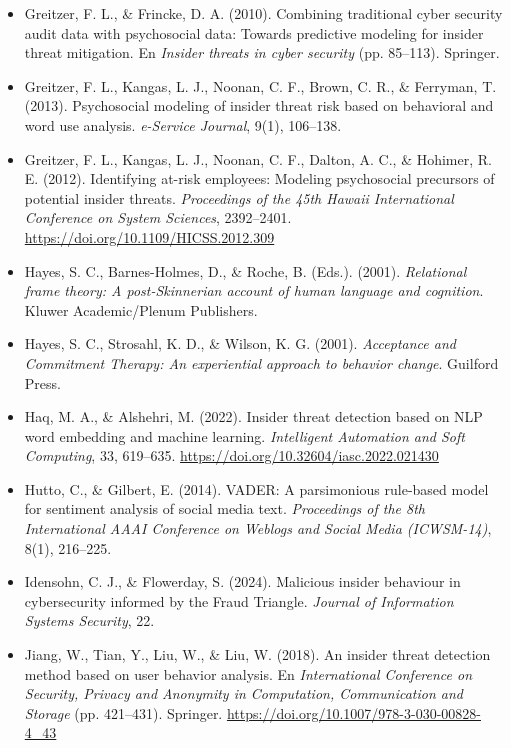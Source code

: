 \documentclass[IB]{TFUOC}%
\begin{document}
\begin{itemize}
    \item Greitzer, F. L., \& Frincke, D. A. (2010). Combining traditional 
    cyber security audit data with psychosocial data: Towards predictive 
    modeling for insider threat mitigation. En \textit{Insider threats in 
    cyber security} (pp. 85--113). Springer.

    \item Greitzer, F. L., Kangas, L. J., Noonan, C. F., Brown, C. R., \& 
    Ferryman, T. (2013). Psychosocial modeling of insider threat risk based 
    on behavioral and word use analysis. \textit{e-Service Journal}, 9(1), 
    106--138.

    \item Greitzer, F. L., Kangas, L. J., Noonan, C. F., Dalton, A. C., \& 
    Hohimer, R. E. (2012). Identifying at-risk employees: Modeling 
    psychosocial precursors of potential insider threats. 
    \textit{Proceedings of the 45th Hawaii International Conference on 
    System Sciences}, 2392--2401. 
    \url{https://doi.org/10.1109/HICSS.2012.309}

    \item Hayes, S. C., Barnes-Holmes, D., \& Roche, B. (Eds.). (2001). \textit{Relational frame theory: A post-Skinnerian account of human language and cognition}. Kluwer Academic/Plenum Publishers.

    \item Hayes, S. C., Strosahl, K. D., \& Wilson, K. G. (2001). \textit{Acceptance and Commitment Therapy: An experiential approach to behavior change}. Guilford Press.

    \item Haq, M. A., \& Alshehri, M. (2022). Insider threat detection based 
    on NLP word embedding and machine learning. \textit{Intelligent Automation 
    and Soft Computing}, 33, 619--635. 
    \url{https://doi.org/10.32604/iasc.2022.021430}

    \item Hutto, C., \& Gilbert, E. (2014). VADER: A parsimonious rule-based 
    model for sentiment analysis of social media text. \textit{Proceedings of 
    the 8th International AAAI Conference on Weblogs and Social Media 
    (ICWSM-14)}, 8(1), 216--225.

    \item Idensohn, C. J., \& Flowerday, S. (2024). Malicious insider behaviour 
    in cybersecurity informed by the Fraud Triangle. \textit{Journal of 
    Information Systems Security}, 22.

    \item Jiang, W., Tian, Y., Liu, W., \& Liu, W. (2018). An insider threat 
    detection method based on user behavior analysis. En \textit{International 
    Conference on Security, Privacy and Anonymity in Computation, Communication 
    and Storage} (pp. 421--431). Springer. 
    \url{https://doi.org/10.1007/978-3-030-00828-4_43}


\end{itemize}
\end{document}
